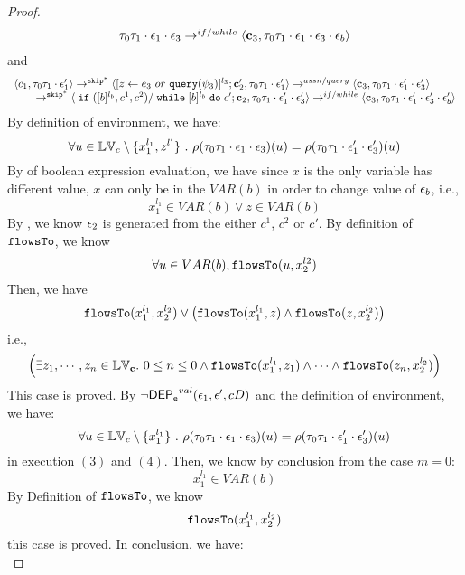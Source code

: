 \begin{proof}
\[\begin{array}{l}
{  \ensuremath{\mathtt{\tau}}_0 \ensuremath{\mathtt{\tau}}_1 \cdot \ensuremath{\mathtt{\epsilon}}_1 \cdot \ensuremath{\mathtt{\epsilon}}_3} 
  \rightarrow^{if / while} 
  \langle {\boldsymbol{\mathbf{c}}}_3,  \mathtt{\tau}_0 \mathtt{\tau}_1 \cdot \mathtt{\epsilon}_1 \cdot \mathtt{\epsilon}_3 \cdot \mathtt{\epsilon}_b \rangle 
\end{array}
 \]
and 
 \[
  \begin{array}{l}   
  \langle c_1, \mathtt{\tau}_0 \mathtt{\tau}_1 \cdot \mathtt{\epsilon}_1' \rangle 
  \rightarrow^{\mathtt{skip}^*} 
  \langle [\mathrel{ z \leftarrow e_3~ or ~ {\tt query}(\psi_3) }]^{l_3}; {\boldsymbol{\mathbf{c}}}_2', 
  \mathtt{\tau}_0 \mathtt{\tau}_1 \cdot \mathtt{\epsilon}_1' \rangle 
  \rightarrow^{assn / query} 
  \langle {\boldsymbol{\mathbf{c}}}_3,  \mathtt{\tau}_0 \mathtt{\tau}_1 \cdot \mathtt{\epsilon}_1' \cdot \mathtt{\epsilon}_3' \rangle 
  \\ 
  \qquad \rightarrow^{\mathtt{skip}^*} 
  \langle \;\mathtt{if}\;([b]{}^{l_b}, c^1, c^2) / \;\mathtt{while}\; [b]{}^{l_b} \;\mathtt{do}\; c'; {\boldsymbol{\mathbf{c}}}_2, 
  \mathtt{\tau}_0 \mathtt{\tau}_1 \cdot \mathtt{\epsilon}_1' \cdot \mathtt{\epsilon}_3' \rangle 
  \rightarrow^{if / while} 
  \langle {\boldsymbol{\mathbf{c}}}_3,  \mathtt{\tau}_0 \mathtt{\tau}_1 \cdot \mathtt{\epsilon}_1' \cdot \mathtt{\epsilon}_3' \cdot \mathtt{\epsilon}_b' \rangle 
\end{array}
 \]
 By definition of environment, we have:
\[
  \forall u \in \mathbb{LV}_c \setminus \{x_1^{l_1}, z^{l'}\} ~.~
  \rho(\mathtt{\tau}_0 \mathtt{\tau}_1 \cdot \mathtt{\epsilon}_1 \cdot \mathtt{\epsilon}_3 ) (u) =  
  \rho(\mathtt{\tau}_0 \mathtt{\tau}_1 \cdot \mathtt{\epsilon}_1' \cdot \mathtt{\epsilon}_3') (u)
\]
%
By  of boolean expression evaluation, we have since $x$ is the only variable has different value, $x$ can only be in the $VAR(b)$ in order to change value of $\mathtt{\epsilon}_b$, i.e.,
 \[
  x_1^{l_1} \in VAR(b) \lor z \in VAR(b)
 \]
 By , we know $\mathtt{\epsilon}_2$ is generated from the either $c^1$, $c^2$ or $c'$.
 By definition of $\mathtt{flowsTo}$, we know
 \[
 \forall u \in VAR(b), \mathtt{flowsTo}(u, x_2^{l2})
 \]
 Then, we have
 \[
  \mathtt{flowsTo}(x_1^{l_1}, x_2^{l_2}) \lor 
  \big(\mathtt{flowsTo}(x_1^{l_1}, z) \land \mathtt{flowsTo}(z, x_2^{l_2}) \big)
 \]
 i.e.,
 \[
 \Big( \exists z_1, \cdots, z_n \in \mathbb{LV}_{{\boldsymbol{\mathbf{c}}}}. ~ 0 \leq n \leq 0 \land
  \mathtt{flowsTo}(x_1^{l_1}, z_1) 
  \land \cdots \land \mathtt{flowsTo}(z_n, x_2^{l_2}) \Big)
 \]
 This case is proved.
%
%
By $\neg \mathsf{DEP_{\mathtt{e}}}^{val}(\mathtt{\epsilon}_1, \mathtt{\epsilon}', c D)$ and the definition of environment, we have:
\[
  \forall u \in \mathbb{LV}_c \setminus \{x_1^{l_1}\} ~.~
  \rho(\mathtt{\tau}_0 \mathtt{\tau}_1 \cdot \mathtt{\epsilon}_1 \cdot \mathtt{\epsilon}_3 ) (u) =  
  \rho(\mathtt{\tau}_0 \mathtt{\tau}_1 \cdot \mathtt{\epsilon}_1' \cdot \mathtt{\epsilon}_3') (u)
\]
in execution $(3)$ and $(4)$.
%
Then, we know by conclusion from the case $m = 0$:
\[
  x_1^{l_1} \in VAR(b)
\]
%
By Definition of $\mathtt{flowsTo}$, we know
\[
  \mathtt{flowsTo}(x_1^{l_1}, x_2^{l_2}) 
\]
this case is proved.
%
In conclusion, we have:
\[
\]
\end{proof}
